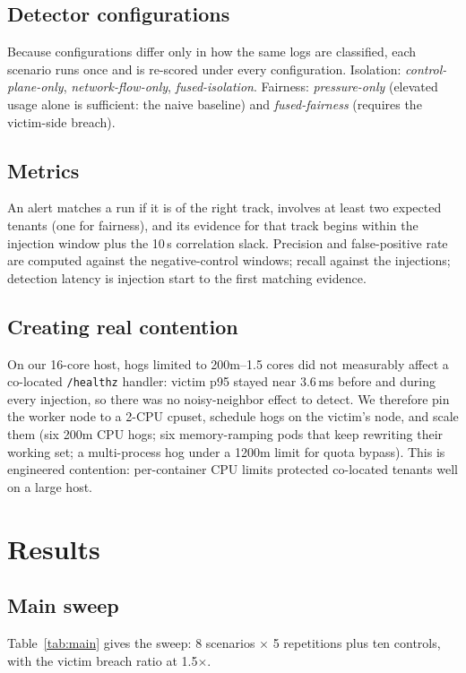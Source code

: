 \documentclass[conference]{IEEEtran}
\newcommand{\code}[1]{\texttt{\small #1}}
\begin{document}
\subsection{Detector configurations}
Because configurations differ only in how the same logs are classified, each scenario runs once and is re-scored under every configuration. Isolation: \emph{control-plane-only}, \emph{network-flow-only}, \emph{fused-isolation}. Fairness: \emph{pressure-only} (elevated usage alone is sufficient: the naive baseline) and \emph{fused-fairness} (requires the victim-side breach).

\subsection{Metrics}
An alert matches a run if it is of the right track, involves at least two expected tenants (one for fairness), and its evidence for that track begins within the injection window plus the 10\,s correlation slack. Precision and false-positive rate are computed against the negative-control windows; recall against the injections; detection latency is injection start to the first matching evidence.

\subsection{Creating real contention}
\label{sec:contention}
On our 16-core host, hogs limited to 200m--1.5 cores did not measurably affect a co-located \code{/healthz} handler: victim p95 stayed near 3.6\,ms before and during every injection, so there was no noisy-neighbor effect to detect. We therefore pin the worker node to a 2-CPU cpuset, schedule hogs on the victim's node, and scale them (six 200m CPU hogs; six memory-ramping pods that keep rewriting their working set; a multi-process hog under a 1200m limit for quota bypass). This is engineered contention: per-container CPU limits protected co-located tenants well on a large host.

\section{Results}
\subsection{Main sweep}
Table~\ref{tab:main} gives the sweep: 8 scenarios $\times$ 5 repetitions plus ten controls, with the victim breach ratio at 1.5$\times$.
\end{document}
